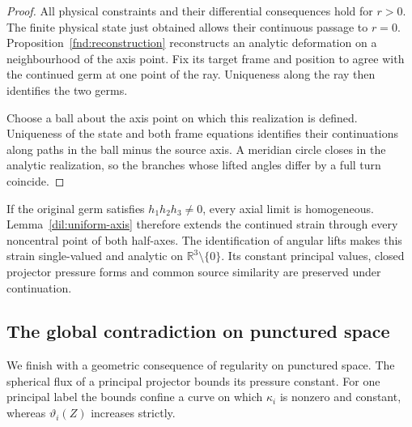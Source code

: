 \documentclass[11pt,a4paper]{article}
\numberwithin{equation}{section}
\theoremstyle{plain}
\theoremstyle{definition}
\theoremstyle{remark}
\begin{document}
\begin{proof}
All physical constraints and their differential consequences hold
for $r>0$.  The finite physical state just obtained
allows their continuous passage to $r=0$. Proposition~\ref{fnd:reconstruction}
reconstructs an analytic deformation on a neighbourhood of the axis point. Fix its
target frame and position to agree with the continued germ at one point
of the ray. Uniqueness along the ray then identifies the two germs.

Choose a ball about the axis point on which this realization is defined.
Uniqueness of the state and both frame equations identifies their
continuations along paths in the ball minus the source axis. A meridian
circle closes in the analytic realization, so the branches whose lifted
angles differ by a full turn coincide.
\end{proof}

If the original germ satisfies $h_1h_2h_3\ne0$, every axial limit
is homogeneous. Lemma~\ref{dil:uniform-axis} therefore extends the continued strain
through every noncentral point of both half-axes. The identification of
angular lifts makes this strain single-valued and analytic on
$\mathbb R^3\setminus\{0\}$. Its constant principal values, closed projector
pressure forms and common source similarity are preserved under continuation.

\subsection{The global contradiction on punctured space}

We finish with a geometric consequence of regularity on punctured
space. The spherical flux of a principal projector bounds its
pressure constant. For one principal label the bounds confine a
curve on which $\kappa_i$ is nonzero and constant, whereas
$\vartheta_i(Z)$ increases strictly.
\end{document}

